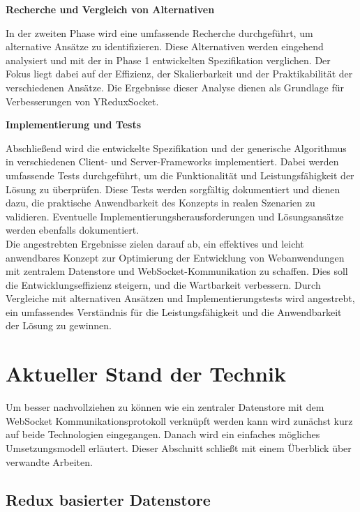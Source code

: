 \documentclass[12pt]{article} %
\begin{document}
\textbf{Recherche und Vergleich von Alternativen}

In der zweiten Phase wird eine umfassende Recherche durchgeführt, um alternative Ansätze zu identifizieren. Diese Alternativen werden eingehend analysiert und mit der in Phase 1 entwickelten Spezifikation verglichen. Der Fokus liegt dabei auf der Effizienz, der Skalierbarkeit und der Praktikabilität der verschiedenen Ansätze. Die Ergebnisse dieser Analyse dienen als Grundlage für Verbesserungen von YReduxSocket. \\

\newpage

\textbf{Implementierung und Tests}

Abschließend wird die entwickelte Spezifikation und der generische Algorithmus in verschiedenen Client- und Server-Frameworks implementiert. Dabei werden umfassende Tests durchgeführt, um die Funktionalität und Leistungsfähigkeit der Lösung zu überprüfen. Diese Tests werden sorgfältig dokumentiert und dienen dazu, die praktische Anwendbarkeit des Konzepts in realen Szenarien zu validieren. Eventuelle Implementierungsherausforderungen und Lösungsansätze werden ebenfalls dokumentiert.
\\

Die angestrebten Ergebnisse zielen darauf ab, ein effektives und leicht anwendbares Konzept zur Optimierung der Entwicklung von Webanwendungen mit zentralem Datenstore und WebSocket-Kommunikation zu schaffen. Dies soll die Entwicklungseffizienz steigern, und die Wartbarkeit verbessern. Durch Vergleiche mit alternativen Ansätzen und Implementierungstests wird angestrebt, ein umfassendes Verständnis für die Leistungsfähigkeit und die Anwendbarkeit der Lösung zu gewinnen.

\section{Aktueller Stand der Technik}
\label{other-work}

Um besser nachvollziehen zu können wie ein zentraler Datenstore mit dem WebSocket Kommunikationsprotokoll verknüpft werden kann wird zunächst kurz auf beide Technologien eingegangen. Danach wird ein einfaches mögliches Umsetzungsmodell erläutert. Dieser Abschnitt schließt mit einem Überblick über verwandte Arbeiten.

\subsection{Redux basierter Datenstore}
\end{document}
